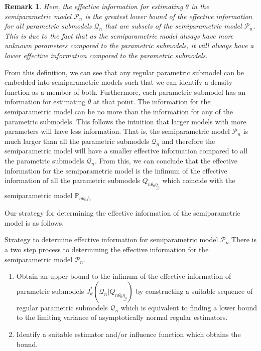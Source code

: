 \documentclass[twoside]{article}
\newtheorem{remark}[theorem]{Remark}
\newcommand{\prob}{\mathbb{P}}
\newcommand{\utilde}{\underset{\sim}}
\begin{document}
\begin{remark}
Here, the effective information for estimating $\theta$ in the semiparametric model $\mathcal{P}_n$ is the greatest lower bound of the effective information for all parametric submodels $\mathcal{Q}_n$ that are subsets of the semiparametric model $\mathcal{P}_n$. This is due to the fact that as the semiparametric model always have more unknown parameters compared to the parametric submodels, it will always have a lower effective information compared to the parametric submodels.
\end{remark}

From this definition, we can see that any regular parametric submodel can be embedded into semiparametric models such that we can identify a density function as a member of both. Furthermore, each parametric submodel has an information for estimating $\theta$ at that point. The information for the semiparametric model can be no more than the information for any of the parametric submodels. This follows the intuition that larger models with more parameters will have less information. That is, the semiparametric model $\mathcal{P}_n$ is much larger than all the parametric submodels $\mathcal{Q}_n$ and therefore the semiparametric model will have a smaller effective information compared to all the parametric submodels $\mathcal{Q}_n$. From this, we can conclude that the effective information for the semiparametric model is the infimum of the effective information of all the parametric submodels $Q_{n \theta_0 \utilde{\eta_{0}}}$ which coincide with the semiparametric model $\prob_{n \theta_0 f_0}$


Our strategy for determining the effective information of the semiparametric model is as follows.
\begin{proposition_exam}{Strategy to determine effective information for semiparametric model $\mathcal{P}_n$}{} There is a two step process to determining the effective information for the semiparametric model $\mathcal{P}_n.$
\begin{enumerate}
  \item Obtain an upper bound to the infimum of the effective information of parametric submodels $J_{\theta}^{*}(\mathcal{Q}_n|Q_{n \theta_{0} \utilde{\eta_{0}}})$ by constructing a suitable sequence of regular parametric submodels $\mathcal{Q}_n$ which is equivalent to finding a lower bound to the limiting variance of asymptotically normal regular estimators. 
  \item Identify a suitable estimator and/or influence function which obtains the bound.
\end{enumerate}
\end{proposition_exam}
\end{document}
